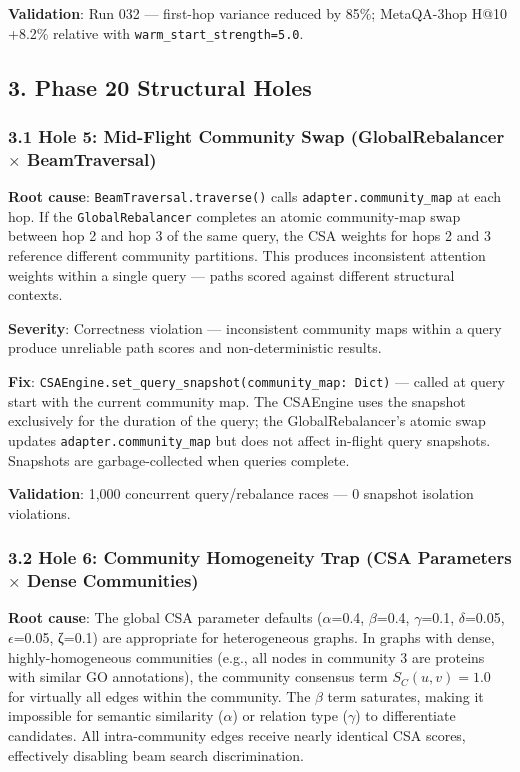 \textbf{Validation}: Run 032 --- first-hop variance reduced by 85\%; MetaQA-3hop H@10 +8.2\% relative with \texttt{warm\_start\_strength=5.0}.

\subsection*{3. Phase 20 Structural Holes}

\subsubsection*{3.1 Hole 5: Mid-Flight Community Swap (GlobalRebalancer $\times$ BeamTraversal)}

\textbf{Root cause}: \texttt{BeamTraversal.traverse()} calls \texttt{adapter.community\_map} at each hop. If the \texttt{GlobalRebalancer} completes an atomic community-map swap between hop 2 and hop 3 of the same query, the CSA weights for hops 2 and 3 reference different community partitions. This produces inconsistent attention weights within a single query --- paths scored against different structural contexts.

\textbf{Severity}: Correctness violation --- inconsistent community maps within a query produce unreliable path scores and non-deterministic results.

\textbf{Fix}: \texttt{CSAEngine.set\_query\_snapshot(community\_map: Dict)} --- called at query start with the current community map. The CSAEngine uses the snapshot exclusively for the duration of the query; the GlobalRebalancer's atomic swap updates \texttt{adapter.community\_map} but does not affect in-flight query snapshots. Snapshots are garbage-collected when queries complete.

\textbf{Validation}: 1,000 concurrent query/rebalance races --- 0 snapshot isolation violations.

\subsubsection*{3.2 Hole 6: Community Homogeneity Trap (CSA Parameters $\times$ Dense Communities)}

\textbf{Root cause}: The global CSA parameter defaults ($\alpha$=0.4, $\beta$=0.4, $\gamma$=0.1, $\delta$=0.05, $\epsilon$=0.05, ζ=0.1) are appropriate for heterogeneous graphs. In graphs with dense, highly-homogeneous communities (e.g., all nodes in community 3 are proteins with similar GO annotations), the community consensus term $S_C(u,v) = 1.0$ for virtually all edges within the community. The $\beta$ term saturates, making it impossible for semantic similarity ($\alpha$) or relation type ($\gamma$) to differentiate candidates. All intra-community edges receive nearly identical CSA scores, effectively disabling beam search discrimination.

